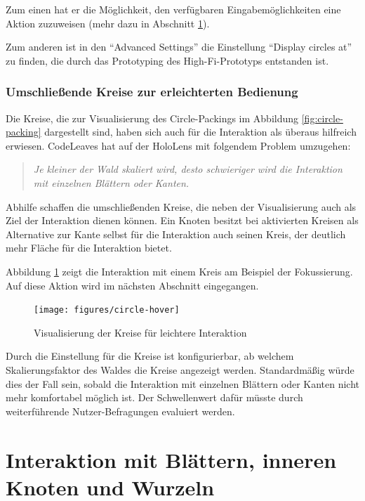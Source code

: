 Zum einen hat er die Möglichkeit, den verfügbaren Eingabemöglichkeiten eine Aktion zuzuweisen (mehr dazu in Abschnitt \ref{sec:object-interaction}).

Zum anderen ist in den "`Advanced Settings"' die Einstellung "`Display circles at"' zu finden, die durch das Prototyping des High-Fi-Prototyps entstanden ist.

\subsubsection*{Umschließende Kreise zur erleichterten Bedienung}
Die Kreise, die zur Visualisierung des Circle-Packings im Abbildung \ref{fig:circle-packing} dargestellt sind, haben sich auch für die Interaktion als überaus hilfreich erwiesen. CodeLeaves hat auf der HoloLens mit folgendem Problem umzugehen:

\begin{quote}
  \textit{Je kleiner der Wald skaliert wird, desto schwieriger wird die Interaktion mit einzelnen Blättern oder Kanten.}
\end{quote}

Abhilfe schaffen die umschließenden Kreise, die neben der Visualisierung auch als Ziel der Interaktion dienen können. Ein Knoten besitzt bei aktivierten Kreisen als Alternative zur Kante selbst für die Interaktion auch seinen Kreis, der deutlich mehr Fläche für die Interaktion bietet.

Abbildung \ref{fig:circle-hover} zeigt die Interaktion mit einem Kreis am Beispiel der Fokussierung. Auf diese Aktion wird im nächsten Abschnitt eingegangen.

\begin{figure}[htb]
  \texttt{[image: figures/circle-hover]}
  \caption{Visualisierung der Kreise für leichtere Interaktion}
  \label{fig:circle-hover}
\end{figure}

Durch die Einstellung für die Kreise ist konfigurierbar, ab welchem Skalierungsfaktor des Waldes die Kreise angezeigt werden. Standardmäßig würde dies der Fall sein, sobald die Interaktion mit einzelnen Blättern oder Kanten nicht mehr komfortabel möglich ist. Der Schwellenwert dafür müsste durch weiterführende Nutzer-Befragungen evaluiert werden.

\section{Interaktion mit Blättern, inneren Knoten und Wurzeln}
\label{sec:object-interaction}

